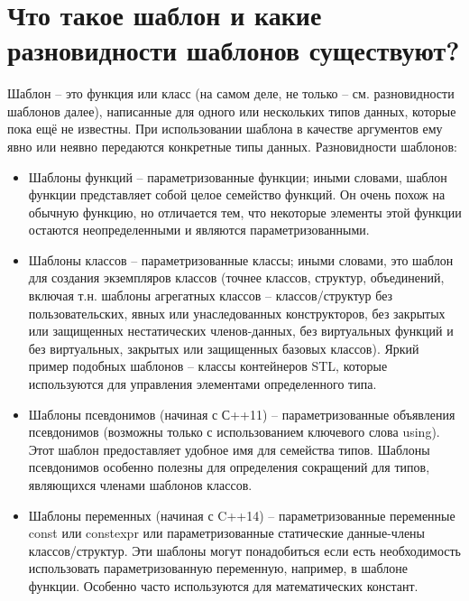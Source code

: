 \documentclass[a4paper,12pt]{article}	%
\title{
	\center{\textbf{Контрольные вопросы}}
	}
\begin{document}

\maketitle

\section{Что такое шаблон и какие разновидности шаблонов существуют?}
	
	Шаблон -- это функция или класс (на самом деле, не только -- см. разновидности шаблонов далее), написанные для одного или нескольких типов данных, которые пока ещё не известны. При использовании шаблона в качестве аргументов ему явно или неявно передаются конкретные типы данных. Разновидности шаблонов:
	
	\begin{itemize}
		
		\item Шаблоны функций -- параметризованные функции; иными словами, шаблон функции представляет собой целое семейство функций. Он очень похож на обычную функцию, но отличается тем, что некоторые элементы этой функции остаются неопределенными и являются параметризованными.
	
		\item Шаблоны классов -- параметризованные классы; иными словами, это шаблон для создания экземпляров классов (точнее классов, структур, объединений, включая т.н. шаблоны агрегатных классов -- классов/структур без пользовательских, явных или унаследованных конструкторов, без закрытых или защищенных нестатических членов-данных, без виртуальных функций и без виртуальных, закрытых или защищенных базовых классов). Яркий пример подобных шаблонов -- классы контейнеров STL, которые используются для управления элементами определенного типа.
	
		\item Шаблоны псевдонимов (начиная с С++11) -- параметризованные объявления псевдонимов (возможны только с использованием ключевого слова using). Этот шаблон предоставляет удобное имя для семейства типов. Шаблоны псевдонимов особенно полезны для определения сокращений для типов, являющихся членами шаблонов классов.
		
		\item Шаблоны переменных (начиная с C++14) -- параметризованные переменные const или constexpr или параметризованные статические данные-члены классов/структур. Эти шаблоны могут понадобиться если есть необходимость использовать параметризованную переменную, например, в шаблоне функции. Особенно часто используются для математических констант.
	
	\end{itemize}
	
\end{document}
